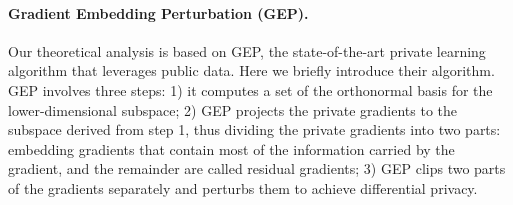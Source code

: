 \documentclass[11pt]{article}
\begin{document}
\paragraph{Gradient Embedding Perturbation (GEP).}
Our theoretical analysis is based on GEP, the state-of-the-art private learning algorithm that leverages public data. Here we briefly introduce their algorithm. GEP involves three steps: 1) it computes a set of the orthonormal basis for the lower-dimensional subspace; 2) GEP projects the private gradients to the subspace derived from step 1, thus dividing the private gradients into two parts: embedding gradients that contain most of the information carried by the gradient, and the remainder are called residual gradients; 3) GEP clips two parts of the gradients separately and perturbs them to achieve differential privacy.
\end{document}
